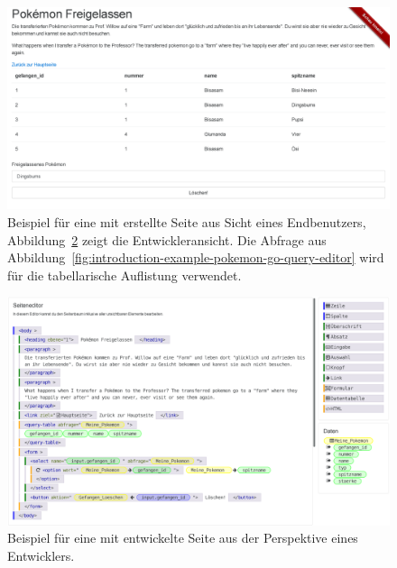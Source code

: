 \begin{figure}[t]
  \includegraphics[width=\textwidth]{images/screenshots/20161019/enduser-pokemongo-delete.png}
  \caption{Beispiel für eine mit \idename{} erstellte Seite aus Sicht eines Endbenutzers,  Abbildung~\ref{fig:introduction-example-pokemon-go-page-editor} zeigt die Entwickleransicht. Die Abfrage aus Abbildung~\ref{fig:introduction-example-pokemon-go-query-editor} wird für die tabellarische Auflistung verwendet.}
  \label{fig:introduction-example-pokemon-go-catch}
\end{figure}

\begin{figure}[p]
  \includegraphics[width=\textwidth]{images/screenshots/20161019/editor-page-full.png}
  \caption{Beispiel für eine mit \idename{} entwickelte Seite aus der Perspektive eines Entwicklers.}
  \label{fig:introduction-example-pokemon-go-page-editor}
\end{figure}

